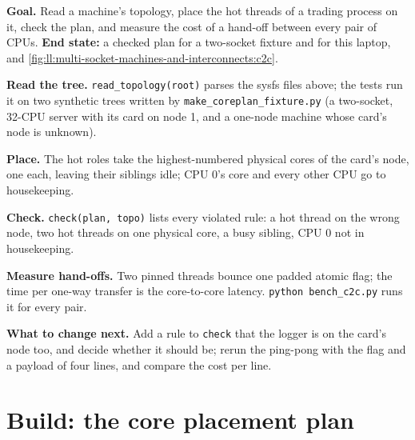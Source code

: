 \begin{tutorial}
\textbf{Goal.} Read a machine's topology, place the hot threads of a trading process on it, check the plan, and measure
the cost of a hand-off between every pair of CPUs. \textbf{End state:} a checked plan for a two-socket fixture and for
this laptop, and \cref{fig:ll:multi-socket-machines-and-interconnects:c2c}.
\begin{tutsteps}
\item \textbf{Read the tree.} \texttt{read\_topology(root)} parses the sysfs files above; the tests run it on two
synthetic trees written by \texttt{make\_coreplan\_fixture.py} (a two-socket, 32-CPU server with its card on node 1, and a
one-node machine whose card's node is unknown).
\item \textbf{Place.} The hot roles take the highest-numbered physical cores of the card's node, one each, leaving their
siblings idle; CPU 0's core and every other CPU go to housekeeping.
\label{lst:ll:multi-socket-machines-and-interconnects:plan}
\item \textbf{Check.} \texttt{check(plan, topo)} lists every violated rule: a hot thread on the wrong node, two hot
threads on one physical core, a busy sibling, CPU 0 not in housekeeping.
\item \textbf{Measure hand-offs.} Two pinned threads bounce one padded atomic flag; the time per one-way transfer is the
core-to-core latency. \texttt{python bench\_c2c.py} runs it for every pair.
\label{lst:ll:multi-socket-machines-and-interconnects:pingpong}
\end{tutsteps}
\textbf{What to change next.} Add a rule to \texttt{check} that the logger is on the card's node too, and decide whether
it should be; rerun the ping-pong with the flag and a payload of four lines, and compare the cost per line.
\end{tutorial}

\section{Build: the core placement plan}\label{bld:ll:multi-socket-machines-and-interconnects:coreplan}

